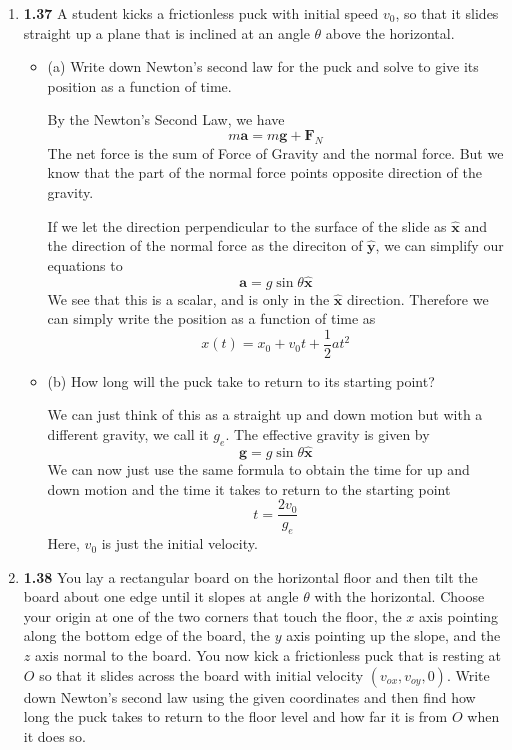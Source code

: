 \documentclass[12pt]{article}
\newcommand{\unx}{\hat{\mathbf{x}}}
\newcommand{\uny}{\hat{\mathbf{y}}}
\begin{document}
\begin{enumerate}

\item \textbf{1.37} A student kicks a frictionless puck with initial speed \( v_0 \), so that it slides straight up a plane that is inclined at an angle \( \theta \) above the horizontal. 
\begin{itemize}
    \item (a) Write down Newton’s second law for the puck and solve to give its position as a function of time.

    By the Newton's Second Law, we have
    \[
    m\mathbf{a} = m\mathbf{g} + \mathbf{F}_N
    \]
    The net force is the sum of Force of Gravity and the normal force. But we know that the part of the normal force points opposite direction of the gravity. 

    If we let the direction perpendicular to the surface of the slide as $\unx$ and the direction of the normal force as the direciton of $\uny$, we can simplify our equations to
    \[
    \mathbf{a} = g\sin\theta \unx
    \]
    We see that this is a scalar, and is only in the $\unx$ direction. Therefore we can simply write the position as a function of time as
    \[
    x(t) = x_0 + v_0 t + \frac{1}{2}at^2
    \]

    
    \item (b) How long will the puck take to return to its starting point?

    We can just think of this as a straight up and down motion but with a different gravity, we call it $g_e$. The effective gravity is given by
    \[
    \mathbf{g} = g\sin\theta\unx
    \]
    We can now just use the same formula to obtain the time for up and down motion and the time it takes to return to the starting point
    \[
    t = \frac{2v_0}{g_e}
    \]
    Here, $v_0$ is just the initial velocity. 
\end{itemize}

\item \textbf{1.38} You lay a rectangular board on the horizontal floor and then tilt the board about one edge until it slopes at angle \( \theta \) with the horizontal. Choose your origin at one of the two corners that touch the floor, the \(x\) axis pointing along the bottom edge of the board, the \(y\) axis pointing up the slope, and the \(z\) axis normal to the board. You now kick a frictionless puck that is resting at \( O \) so that it slides across the board with initial velocity \( (v_{ox}, v_{oy}, 0) \). Write down Newton’s second law using the given coordinates and then find how long the puck takes to return to the floor level and how far it is from \( O \) when it does so.


\end{enumerate}
\end{document}
